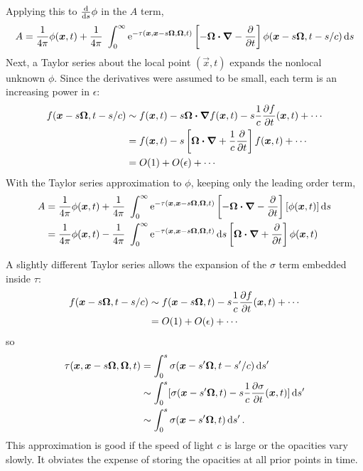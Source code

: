 Applying this to $\frac{\mathrm{d} }{\mathrm{d} s}\phi$ in the $A$ term,
\begin{equation*}
A = \frac{1}{4\pi}\phi(\bm{x}, t)
+ \frac{1}{4\pi}\ \int_{0}^{\infty} \mathop{}\!\mathrm{e}^{-\tau(\bm{x}, \bm{x} - s \bm{\Omega}, \bm{\Omega}, t)}
\left[ -\bm{\Omega} \bm{\cdot} \bm{\nabla} - \frac{\partial }{\partial t} \right] \phi(\bm{x} - s \bm{\Omega}, t-s/c)
\mathop{}\!\mathrm{d} s
\end{equation*}
Next, a Taylor series about the local point $(\vec{x}, t)$ expands the
nonlocal unknown $\phi$. Since the derivatives were assumed to be small, each
term is an increasing power in $\epsilon$:
\begin{align*}
  f(\bm{x} - s \bm{\Omega}, t-s/c)
  &\sim
  f(\bm{x}, t) - s \bm{\Omega} \bm{\cdot} \bm{\nabla} f(\bm{x}, t)
  - s\frac{1}{c} \frac{\partial f}{\partial t}(\bm{x}, t) + \cdots
  \\
  &= f(\bm{x}, t) - s \left[ \bm{\Omega} \bm{\cdot} \bm{\nabla}
  + \frac{1}{c} \frac{\partial }{\partial t} \right] f(\bm{x}, t) + \cdots
  \\
  &= O(1) +
  O(\epsilon) + \cdots
\end{align*}
With the Taylor series approximation to $\phi$, keeping only the leading order
term,
\begin{align*}
A &= \frac{1}{4\pi}\phi(\bm{x}, t)
+ \frac{1}{4\pi}\ \int_{0}^{\infty} \mathop{}\!\mathrm{e}^{-\tau(\bm{x}, \bm{x} - s \bm{\Omega}, \bm{\Omega}, t)}
\left[ -\bm{\Omega} \bm{\cdot} \bm{\nabla} - \frac{\partial }{\partial t} \right][\phi(\bm{x}, t)]
\mathop{}\!\mathrm{d} s
\\
&= \frac{1}{4\pi}\phi(\bm{x}, t)
- \frac{1}{4\pi}\ \int_{0}^{\infty} \mathop{}\!\mathrm{e}^{-\tau(\bm{x}, \bm{x} - s \bm{\Omega}, \bm{\Omega}, t)}
\mathop{}\!\mathrm{d} s
\left[ \bm{\Omega} \bm{\cdot} \bm{\nabla} + \frac{\partial }{\partial t} \right]\phi(\bm{x}, t)
\end{align*}

A slightly different Taylor series allows the expansion of the $\sigma$ term
embedded inside $\tau$:
\begin{align*}
  f(\bm{x} - s \bm{\Omega}, t-s/c)
  &\sim
  f(\bm{x} - s \bm{\Omega}, t)
  - s\frac{1}{c} \frac{\partial f}{\partial t}(\bm{x}, t) + \cdots
  \\
  &= O(1) + O(\epsilon) + \cdots
\end{align*}
so
\begin{align*}
  \tau(\bm{x}, \bm{x} - s \bm{\Omega}, \bm{\Omega}, t)
  &=  \int_{0}^{s} \sigma(\bm{x}-s'\bm{\Omega}, t-s'/c) \mathop{}\!\mathrm{d} s'
  \\
  &\sim \int_{0}^{s} [\sigma(\bm{x}-s'\bm{\Omega}, t)-s\frac{1}{c}
  \frac{\partial \sigma}{\partial t}(\bm{x}, t)] \mathop{}\!\mathrm{d} s'
  \\
  &\sim \int_{0}^{s} \sigma(\bm{x}-s'\bm{\Omega}, t) \mathop{}\!\mathrm{d} s'\,.
\end{align*}
This approximation is good if the speed of light $c$ is large or the opacities
vary slowly. It obviates the expense of storing the opacities at all
prior points in time.

